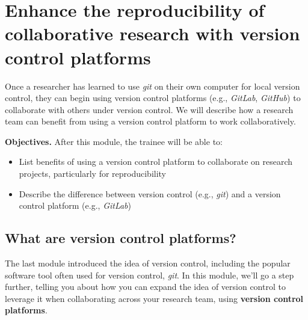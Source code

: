 \documentclass[]{tufte-book}
\providecommand{\tightlist}{%
  \setlength{\itemsep}{0pt}\setlength{\parskip}{0pt}}
\begin{document}
\hypertarget{enhance-the-reproducibility-of-collaborative-research-with-version-control-platforms}{%
\section{Enhance the reproducibility of collaborative research with version control platforms}\label{enhance-the-reproducibility-of-collaborative-research-with-version-control-platforms}}

Once a researcher has learned to use \emph{git} on their own computer for
local version control, they can begin using version control platforms (e.g.,
\emph{GitLab}, \emph{GitHub}) to collaborate with others under version
control. We will describe how a research team can benefit from using a version
control platform to work collaboratively.

\textbf{Objectives.} After this module, the trainee will be able to:

\begin{itemize}
\tightlist
\item
  List benefits of using a version control platform to collaborate
  on research projects, particularly for reproducibility
\item
  Describe the difference between version control (e.g., \emph{git}) and
  a version control platform (e.g., \emph{GitLab})
\end{itemize}

\hypertarget{what-are-version-control-platforms}{%
\subsection{What are version control platforms?}\label{what-are-version-control-platforms}}

The last module introduced the idea of version control, including the
popular software tool often used for version control, \emph{git}. In this
module, we'll go a step further, telling you about how you can expand
the idea of version control to leverage it when collaborating across
your research team, using \textbf{version control platforms}.
\end{document}
